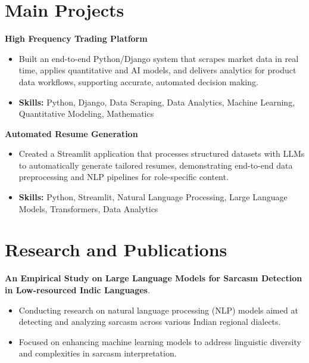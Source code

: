 \documentclass[a4paper,11pt]{article}
\begin{document}
\section{\textbf{Main Projects}}

\vspace{1mm}
  \textbf{High Frequency Trading Platform  }
\vspace{-1.5mm} %
\begin{itemize}
  \item Built an end-to-end Python/Django system that scrapes market data in real time, applies quantitative and AI models, and delivers analytics for product data workflows, supporting accurate, automated decision making.
\vspace{-3mm}
  \item \textbf{Skills:} Python, Django, Data Scraping, Data Analytics, Machine Learning, Quantitative Modeling, Mathematics
\end{itemize}


\vspace{1mm}
   \textbf{Automated Resume Generation }
\vspace{-1.5mm} %
\begin{itemize}
  \item Created a Streamlit application that processes structured datasets with LLMs to automatically generate tailored resumes, demonstrating end-to-end data preprocessing and NLP pipelines for role-specific content.
\vspace{-3mm}
  \item \textbf{Skills:} Python, Streamlit, Natural Language Processing, Large Language Models, Transformers, Data Analytics
\end{itemize}



\section{\textbf{Research and Publications} \hfill }
\vspace{1mm}
  \textbf{An Empirical Study on Large Language Models for Sarcasm Detection in Low-resourced Indic Languages}.
\vspace{-1mm} %
\begin{itemize}
  \item Conducting research on natural language processing (NLP) models aimed at detecting and analyzing sarcasm across various Indian regional dialects.
\vspace{-3mm}
  \item Focused on enhancing machine learning models to address linguistic diversity and complexities in sarcasm interpretation.
\end{itemize}
\end{document}
